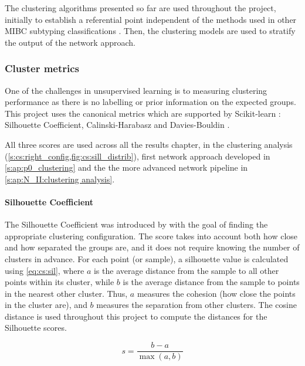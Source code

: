 The clustering algorithms presented so far are used throughout the project, initially to establish a referential point independent of the methods used in other MIBC subtyping classifications \citep{Robertson2017-mg, Marzouka2018-ge, Kamoun2020-tj}. Then, the clustering models are used to stratify the output of the network approach.


\subsubsection*{Cluster metrics} \label{s:lit:clustering_metrics}

One of the challenges in unsupervised learning is to measuring clustering performance as there is no labelling or prior information on the expected groups. This project uses the canonical metrics which are supported by Scikit-learn \citep{Pedregosa2011-ts,Scikit-learn_undated-ax}: Silhouette Coefficient, Calinski-Harabasz and Davies-Bouldin \citep{Rousseeuw1987-wy,Calinski1974-uu,Davies1979-tn}. 

All three scores are used across all the results chapter, in the clustering analysis (\cref{s:cs:right_config,fig:cs:sill_distrib}), first network approach developed in \cref{s:ap:p0_clustering} and the the more advanced network pipeline in \cref{s:ap:N_II:clustering analysis}.


\paragraph*{Silhouette Coefficient} \label{s:lit:silhouette}

The Silhouette Coefficient was introduced by \citet{Rousseeuw1987-wy} with the goal of finding the appropriate clustering configuration. The score takes into account both how close and how separated the groups are, and it does not require knowing the number of clusters in advance. For each point (or sample), a silhouette value is calculated using \cref{eq:cs:sil}, where \(a\) is the average distance from the sample to all other points within its cluster, while \(b\) is the average distance from the sample to points in the nearest other cluster. Thus, \(a\) measures the cohesion (how close the points in the cluster are), and \(b\) measures the separation from other clusters. The cosine distance is used throughout this project to compute the distances for the Silhouette scores.

\begin{equation} \label{eq:cs:sil}
    s = \frac{b - a}{\max(a, b)}
\end{equation}


